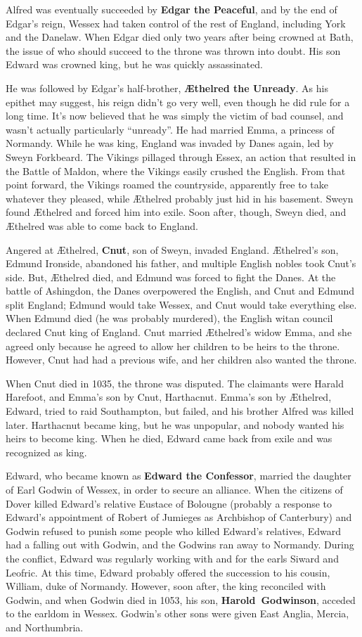 Alfred was eventually succeeded by \textbf{Edgar the Peaceful}, and by the end of Edgar's reign,
Wessex had taken control of the rest of England, including York and the Danelaw.
When Edgar died only two years after being crowned at Bath,
the issue of who should succeed to the throne was thrown into doubt.
His son Edward was crowned king, but he was quickly assassinated.

He was followed by Edgar's half-brother, \textbf{\AE{}thelred the Unready}.
As his epithet may suggest, his reign didn't go very well, even though he did rule for a long time.
It's now believed that he was simply the victim of bad counsel, and wasn't actually particularly ``unready''.
He had married Emma, a princess of Normandy.
While he was king, England was invaded by Danes again, led by Sweyn Forkbeard.
The Vikings pillaged through Essex, an action that resulted in the Battle of Maldon,
where the Vikings easily crushed the English.
From that point forward, the Vikings roamed the countryside, apparently free to take whatever they pleased,
while \AE{}thelred probably just hid in his basement.
Sweyn found \AE{}thelred and forced him into exile.
Soon after, though, Sweyn died, and \AE{}thelred was able to come back to England.

Angered at \AE{}thelred, \textbf{Cnut}, son of Sweyn, invaded England.
\AE{}thelred's son, Edmund Ironside, abandoned his father, and multiple English nobles took Cnut's side.
But, \AE{}thelred died, and Edmund was forced to fight the Danes.
At the battle of Ashingdon, the Danes overpowered the English, and Cnut and Edmund split England;
Edmund would take Wessex, and Cnut would take everything else.
When Edmund died (he was probably murdered), the English witan council declared Cnut king of England.
Cnut married \AE{}thelred's widow Emma,
and she agreed only because he agreed to allow her children to be heirs to the throne.
However, Cnut had had a previous wife, and her children also wanted the throne.

When Cnut died in 1035, the throne was disputed.
The claimants were Harald Harefoot, and Emma's son by Cnut, Harthacnut.
Emma's son by \AE{}thelred, Edward, tried to raid Southampton, but failed, and his brother Alfred was killed later.
Harthacnut became king, but he was unpopular, and nobody wanted his heirs to become king.
When he died, Edward came back from exile and was recognized as king.

Edward, who became known as \textbf{Edward the Confessor},
married the daughter of Earl Godwin of Wessex, in order to secure an alliance.
When the citizens of Dover killed Edward's relative Eustace of Bolougne
(probably a response to Edward's appointment of Robert of Jumieges as Archbishop of Canterbury)
and Godwin refused to punish some people who killed Edward's relatives,
Edward had a falling out with Godwin, and the Godwins ran away to Normandy.
During the conflict, Edward was regularly working with and for the earls Siward and Leofric.
At this time, Edward probably offered the succession to his cousin, William, duke of Normandy.
However, soon after, the king reconciled with Godwin, and when Godwin died in 1053,
his son, \textbf{Harold~Godwinson}, acceded to the earldom in Wessex.
Godwin's other sons were given East Anglia, Mercia, and Northumbria.

